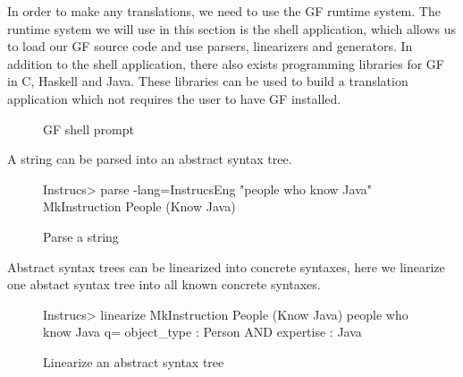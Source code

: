 In order to make any translations, we need to use the GF runtime system. The  runtime system we will use in this section is the shell application, which allows us to load our GF source code and use parsers, linearizers and generators. In addition to the shell application, there also exists programming libraries for GF in C, Haskell and Java. These libraries can be used to build a translation application which not requires the user to have GF installed.

\begin{figure}[H]

\caption{GF shell prompt\label{fig:gf-shell}}
\end{figure}

A string can be parsed into an abstract syntax tree.

\begin{figure}[H]
\begin{terminal}
Instrucs> parse -lang=InstrucsEng "people who know Java"
MkInstruction People (Know Java)
\end{terminal}

\caption{Parse a string\label{fig:parse-a-string}}
\end{figure}

Abstract syntax trees can be linearized into concrete syntaxes, here we linearize one abstact syntax tree into all known concrete syntaxes.

\begin{figure}[H]
\begin{terminal}
Instrucs> linearize MkInstruction People (Know Java)
people who know Java
q= object_type : Person AND expertise : Java
\end{terminal}

\caption{Linearize an abstract syntax tree\label{fig:linearization}}
\end{figure}


